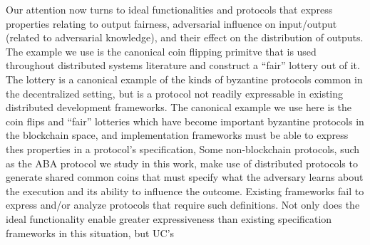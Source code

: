 Our attention now turns to ideal functionalities and protocols that express properties relating to output fairness, adversarial influence on input/output (related to adversarial knowledge), and their effect on the distribution of outputs.
The example we use is the canonical coin flipping primitve that is used throughout distributed systems literature and construct a ``fair'' lottery out of it.
The lottery is a canonical example of the kinds of byzantine protocols common in the decentralized setting, but is a protocol not readily expressable in existing distributed development frameworks.
The canonical example we use here is the coin flips and ``fair'' lotteries which have become important byzantine protocols in the blockchain space, and implementation frameworks must be able to express thes properties in a protocol's specification, 
Some non-blockchain protocols, such as the ABA protocol we study in this work, make use of distributed protocols to generate shared common coins that must specify what the adversary learns about the execution and its ability to influence the outcome. 
Existing frameworks fail to express and/or analyze protocols that require such definitions.
Not only does the ideal functionality enable greater expressiveness than existing specification frameworks in this situation, but UC's 



